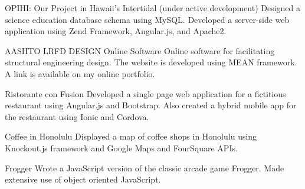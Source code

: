 \begin{cventries}

	\cventry
	{OPIHI: Our Project in Hawaii's Intertidal (under active development)}
	{}
	{}
	{}
	{Designed a science education database schema using MySQL. Developed a server-side web application using Zend Framework, Angular.js, and Apache2.}
	
	\cventry
	{AASHTO LRFD DESIGN Online Software}
	{}
	{}
	{}
	{Online software for facilitating structural engineering design. The website is developed using MEAN framework. A link is available on my online portfolio. }

	\cventry
	{Ristorante con Fusion
	}
	{}
	{}
	{}
	{Developed a single page web application for a fictitious restaurant using Angular.js and Bootstrap.  Also created a hybrid mobile app for the restaurant using Ionic and Cordova.}

	\cventry
	{Coffee in Honolulu
	}
	{}
	{}
	{}
	{Displayed a map of coffee shops in Honolulu using Knockout.js framework and Google Maps and FourSquare APIs.}

	\cventry
	{Frogger
	}
	{}
	{}
	{}
	{Wrote a JavaScript version of the classic arcade game Frogger. Made extensive use of object oriented JavaScript.}



\end{cventries}
